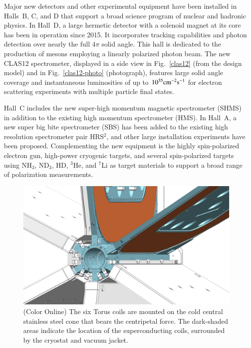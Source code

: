\documentclass[final,3p,twocolumn]{elsarticle}
\begin{document}
Major new detectors and other experimental equipment have been installed in Halls~B, C, and D that support a broad
science program of nuclear and hadronic physics. In Hall~D, a large hermetic detector with a solenoid magnet at its core
has been in operation since 2015. It incorporates tracking capabilities and photon detection over nearly the full $4\pi$
solid angle. This hall is dedicated to the production of mesons employing a linearly polarized photon beam. The new
CLAS12 spectrometer, displayed in a side view in Fig.~\ref{clas12} (from the design model) and in Fig.~\ref{clas12-photo}
(photograph), features large solid angle coverage and instantaneous luminosities of up to $\rm {10^{35}cm^{-2}s^{-1}}$ for
electron scattering experiments with multiple particle final states. 

Hall~C includes the new super-high momentum magnetic spectrometer (SHMS) in addition to the existing high momentum
spectrometer (HMS). In Hall~A, a new super big bite spectrometer (SBS) has been added to the existing high resolution 
spectrometer pair HRS$^2$, and other large installation experiments have been proposed. Complementing the new
equipment is the highly spin-polarized electron gun, high-power cryogenic targets, and several spin-polarized targets using
NH$_3$, ND$_3$, HD, $^3$He, and $^7$Li as target materials to support a broad range of polarization measurements.   

\begin{figure}[htbp!]
\centerline{\includegraphics[width=1.00\columnwidth]{torus-hub-2.png}}
\caption{(Color Online) The six Torus coils are mounted on the cold central stainless steel cone that bears the centripetal force. The
dark-shaded areas indicate the location of the superconducting coils, surrounded by the cryostat and vacuum jacket.}
\label{coil-mount}
\end{figure}
\end{document}
